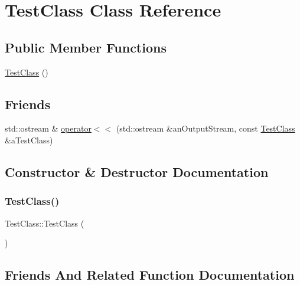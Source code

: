 \hypertarget{classTestClass}{}\section{Test\+Class Class Reference}
\label{classTestClass}
\subsection*{Public Member Functions}
\begin{DoxyCompactItemize}
\item 
\hyperlink{classTestClass_a09903432ed60c7c38f1beccc4cf18987}{Test\+Class} ()
\end{DoxyCompactItemize}
\subsection*{Friends}
\begin{DoxyCompactItemize}
\item 
std\+::ostream \& \hyperlink{classTestClass_a045b8c98a8b3c6d5692e1fa8dbedb1ac}{operator$<$$<$} (std\+::ostream \&an\+Output\+Stream, const \hyperlink{classTestClass}{Test\+Class} \&a\+Test\+Class)
\end{DoxyCompactItemize}


\subsection{Constructor \& Destructor Documentation}
\mbox{\label{classTestClass_a09903432ed60c7c38f1beccc4cf18987}} 
\subsubsection{\texorpdfstring{Test\+Class()}{TestClass()}}
{\footnotesize\ttfamily Test\+Class\+::\+Test\+Class (\begin{DoxyParamCaption}{ }\end{DoxyParamCaption})}



\subsection{Friends And Related Function Documentation}
\mbox{\label{classTestClass_a045b8c98a8b3c6d5692e1fa8dbedb1ac}} 
